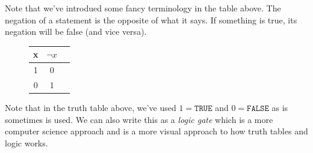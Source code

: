 \documentclass[12pt,a4paper]{book}
\begin{document}
			Note that we've introdued some fancy terminology in the table above. The negation of a statement is the opposite of what it says. If something is true, its negation will be false (and vice versa). 
			\begin{figure}
				\centering
				\begin{minipage}{0.7\linewidth}
					\begin{table}[H]
						\centering
						\begin{tabular}{c|c|c}
							x & $\lnot x$ \\
							\hline
							1 & 0 \\
							0 & 1
						\end{tabular}
					\end{table}
				\end{minipage}
				\begin{minipage}{0.29\linewidth}
					\centering
				\end{minipage}
			\end{figure}
			Note that in the truth table above, we've used $1=\texttt{TRUE}$ and $0 = \texttt{FALSE}$ as is sometimes is used. We can also write this as a \textit{logic gate} which is a more computer science approach and is a more visual approach to how truth tables and logic works. 
			
\end{document}
